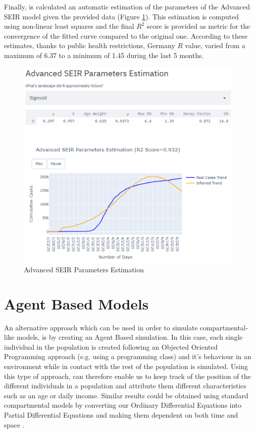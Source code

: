 \vspace{-0.3cm}
Finally, is calculated an automatic estimation of the parameters of the Advanced SEIR model given the provided data (Figure \ref{par_est}). This estimation is computed using non-linear least squares and the final $R^{2}$ score is provided as metric for the convergence of the fitted curve compared to the original one. According to these estimates, thanks to public health restrictions, Germany $R$ value, varied from a maximum of 6.37 to a minimum of 1.45 during the last 5 months.

\begin{figure}[ht!]%
    \centering
    \includegraphics[width=0.75\linewidth]{latex/images/germ_params.pdf}
    \caption{Advanced SEIR Parameters Estimation}
    \label{par_est}
\end{figure}

\section{Agent Based Models}
\label{agent_smith}
An alternative approach which can be used in order to simulate compartmental-like models, is by creating an Agent Based simulation. In this case, each single individual in the population is created following an Objected Oriented Programming approach (e.g. using a programming class) and it's behaviour in an environment while in contact with the rest of the population is simulated. Using this type of approach, can therefore enable us to keep track of the position of the different individuals in a population and attribute them different characteristics such as an age or daily income. Similar results could be obtained using standard compartmental models by converting our Ordinary Differential Equations into Partial Differential Equations and making them dependent on both time and space \cite{pde}.

